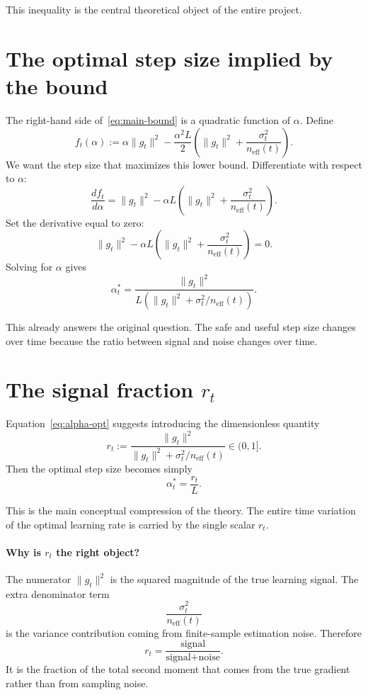 \documentclass[11pt]{article}
\begin{document}
This inequality is the central theoretical object of the entire project.

\section{The optimal step size implied by the bound}

The right-hand side of~\eqref{eq:main-bound} is a quadratic function of $\alpha$. Define
\[
f_t(\alpha)
:=
\alpha\|g_t\|^2
-
\frac{\alpha^2L}{2}
\left(
\|g_t\|^2 + \frac{\sigma_t^2}{n_{\mathrm{eff}}(t)}
\right).
\]
We want the step size that maximizes this lower bound. Differentiate with respect to $\alpha$:
\[
\frac{d f_t}{d\alpha}
=
\|g_t\|^2
-
\alpha L
\left(
\|g_t\|^2 + \frac{\sigma_t^2}{n_{\mathrm{eff}}(t)}
\right).
\]
Set the derivative equal to zero:
\[
\|g_t\|^2
-
\alpha L
\left(
\|g_t\|^2 + \frac{\sigma_t^2}{n_{\mathrm{eff}}(t)}
\right)
=
0.
\]
Solving for $\alpha$ gives
\begin{equation}
\alpha_t^*
=
\frac{\|g_t\|^2}{L\left(\|g_t\|^2 + \sigma_t^2/n_{\mathrm{eff}}(t)\right)}.
\label{eq:alpha-opt}
\end{equation}

This already answers the original question. The safe and useful step size changes over time because the ratio between signal and noise changes over time.

\section{The signal fraction $r_t$}

Equation~\eqref{eq:alpha-opt} suggests introducing the dimensionless quantity
\begin{equation}
r_t
:=
\frac{\|g_t\|^2}{\|g_t\|^2 + \sigma_t^2/n_{\mathrm{eff}}(t)}
\in (0,1].
\label{eq:rt-def}
\end{equation}
Then the optimal step size becomes simply
\begin{equation}
\alpha_t^* = \frac{r_t}{L}.
\label{eq:alpha-rt}
\end{equation}

This is the main conceptual compression of the theory. The entire time variation of the optimal learning rate is carried by the single scalar $r_t$.

\paragraph{Why is $r_t$ the right object?}
The numerator $\|g_t\|^2$ is the squared magnitude of the true learning signal. The extra denominator term
\[
\frac{\sigma_t^2}{n_{\mathrm{eff}}(t)}
\]
is the variance contribution coming from finite-sample estimation noise. Therefore
\[
r_t
=
\frac{\text{signal}}{\text{signal} + \text{noise}}.
\]
It is the fraction of the total second moment that comes from the true gradient rather than from sampling noise.
\end{document}

